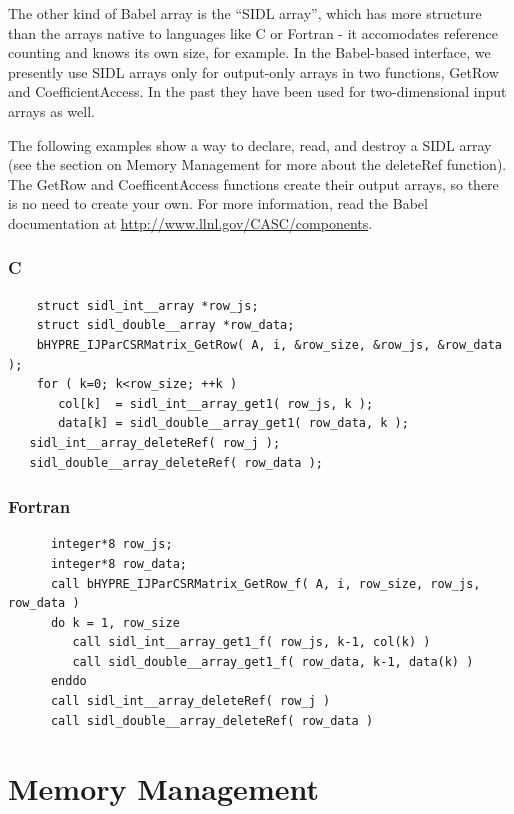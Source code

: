 The other kind of Babel array is the ``SIDL array'', which has more
structure than the arrays native to languages like C or Fortran - it
accomodates reference counting and knows its own size, for example.
In the \hypre{} Babel-based interface, we presently use SIDL arrays
only for output-only arrays in two functions, GetRow and
CoefficientAccess. In the past they have been used for two-dimensional
input arrays as well.

The following examples show a way to declare, read, and destroy a SIDL
array (see the section on Memory Management for more about the
deleteRef function).  The GetRow and CoefficentAccess functions create
their output arrays, so there is no need to create your own.  For more
information, read the Babel documentation at
\url{http://www.llnl.gov/CASC/components}.


\subsubsection{C}
\begin{verbatim}
    struct sidl_int__array *row_js;
    struct sidl_double__array *row_data;
    bHYPRE_IJParCSRMatrix_GetRow( A, i, &row_size, &row_js, &row_data );
    for ( k=0; k<row_size; ++k )
       col[k]  = sidl_int__array_get1( row_js, k );
       data[k] = sidl_double__array_get1( row_data, k );
   sidl_int__array_deleteRef( row_j );
   sidl_double__array_deleteRef( row_data );
\end{verbatim}
\subsubsection{Fortran}
\begin{verbatim}
      integer*8 row_js;
      integer*8 row_data;
      call bHYPRE_IJParCSRMatrix_GetRow_f( A, i, row_size, row_js, row_data )
      do k = 1, row_size
         call sidl_int__array_get1_f( row_js, k-1, col(k) )
         call sidl_double__array_get1_f( row_data, k-1, data(k) )
      enddo
      call sidl_int__array_deleteRef( row_j )
      call sidl_double__array_deleteRef( row_data )
\end{verbatim}


\section{Memory Management}

